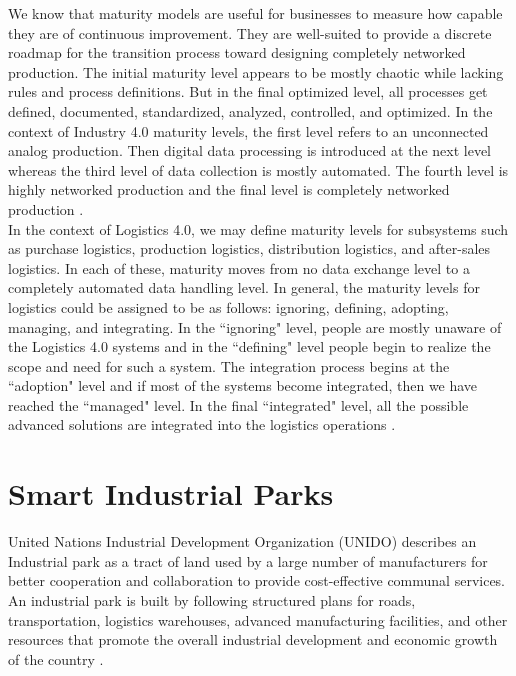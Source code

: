 \documentclass[paper=a4wide, fontsize=12pt]{scrartcl}
\begin{document}
We know that maturity models are useful for businesses to measure how capable they are of continuous improvement. They are well-suited to provide a discrete roadmap for the transition process toward designing completely networked production. The initial maturity level appears to be mostly chaotic while lacking rules and process definitions. But in the final optimized level, all processes get defined, documented, standardized, analyzed, controlled, and optimized. In the context of Industry 4.0 maturity levels, the first level refers to an unconnected analog production. Then digital data processing is introduced at the next level whereas the third level of data collection is mostly automated. The fourth level is highly networked production and the final level is completely networked production \cite{Facchini2019}. \\

In the context of Logistics 4.0, we may define maturity levels for subsystems such as purchase logistics, production logistics, distribution logistics, and after-sales logistics. In each of these, maturity moves from no data exchange level to a completely automated data handling level. In general, the maturity levels for logistics could be assigned to be as follows: ignoring, defining, adopting, managing, and integrating. In the ``ignoring" level, people are mostly unaware of the Logistics 4.0 systems and in the ``defining" level people begin to realize the scope and need for such a system. The integration process begins at the ``adoption" level and if most of the systems become integrated, then we have reached the ``managed" level. In the final ``integrated" level, all the possible advanced solutions are integrated into the logistics operations \cite{Facchini2019}.

\section{Smart Industrial Parks}

United Nations Industrial Development Organization (UNIDO) describes an Industrial park as a tract of land used by a large number of manufacturers for better cooperation and collaboration to provide cost-effective communal services. An industrial park is built by following structured plans for roads, transportation, logistics warehouses, advanced manufacturing facilities, and other resources that promote the overall industrial development and economic growth of the country \cite{QIU201316}. \\
\end{document}
